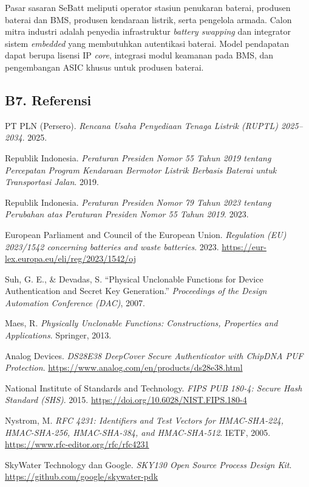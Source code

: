 \documentclass[11pt,a4paper]{article}
\begin{document}
Pasar sasaran SeBatt meliputi operator stasiun penukaran baterai, produsen baterai dan BMS, produsen kendaraan listrik, serta pengelola armada. Calon mitra industri adalah penyedia infrastruktur \textit{battery swapping} dan integrator sistem \textit{embedded} yang membutuhkan autentikasi baterai. Model pendapatan dapat berupa lisensi IP \textit{core}, integrasi modul keamanan pada BMS, dan pengembangan ASIC khusus untuk produsen baterai.

\subsection{B7. Referensi}

\begin{enumerate}[label={[\arabic*]},ref={\arabic*}]
  \item\label{ref:ruptl} PT PLN (Persero). \textit{Rencana Usaha Penyediaan Tenaga Listrik (RUPTL) 2025--2034}. 2025.
  \item Republik Indonesia. \textit{Peraturan Presiden Nomor 55 Tahun 2019 tentang Percepatan Program Kendaraan Bermotor Listrik Berbasis Baterai untuk Transportasi Jalan}. 2019.
  \item Republik Indonesia. \textit{Peraturan Presiden Nomor 79 Tahun 2023 tentang Perubahan atas Peraturan Presiden Nomor 55 Tahun 2019}. 2023.
  \item European Parliament and Council of the European Union. \textit{Regulation (EU) 2023/1542 concerning batteries and waste batteries}. 2023. \url{https://eur-lex.europa.eu/eli/reg/2023/1542/oj}
  \item\label{ref:suh} Suh, G. E., \& Devadas, S. ``Physical Unclonable Functions for Device Authentication and Secret Key Generation.'' \textit{Proceedings of the Design Automation Conference (DAC)}, 2007.
  \item\label{ref:maes} Maes, R. \textit{Physically Unclonable Functions: Constructions, Properties and Applications}. Springer, 2013.
  \item\label{ref:ds28e38} Analog Devices. \textit{DS28E38 DeepCover Secure Authenticator with ChipDNA PUF Protection}. \url{https://www.analog.com/en/products/ds28e38.html}
  \item\label{ref:fips} National Institute of Standards and Technology. \textit{FIPS PUB 180-4: Secure Hash Standard (SHS)}. 2015. \url{https://doi.org/10.6028/NIST.FIPS.180-4}
  \item\label{ref:rfc} Nystrom, M. \textit{RFC 4231: Identifiers and Test Vectors for HMAC-SHA-224, HMAC-SHA-256, HMAC-SHA-384, and HMAC-SHA-512}. IETF, 2005. \url{https://www.rfc-editor.org/rfc/rfc4231}
  \item\label{ref:sky130} SkyWater Technology dan Google. \textit{SKY130 Open Source Process Design Kit}. \url{https://github.com/google/skywater-pdk}
\end{enumerate}
\end{document}
